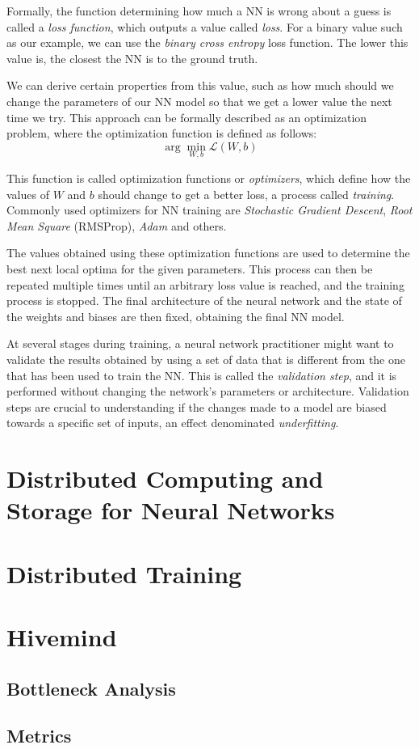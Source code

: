 Formally, the function determining how much a NN is wrong about a guess is called a \textit{loss function}, which outputs a value called \textit{loss}.
For a binary value such as our example, we can use the \textit{binary cross entropy} loss function.
The lower this value is, the closest the NN is to the ground truth.

We can derive certain properties from this value, such as how much should we change the parameters of our NN model so that we get a lower value the next time we try.
This approach can be formally described as an optimization problem, where the optimization function is defined as follows:
\begin{equation}
    \arg \min_{W, b} \mathcal{L} (W, b)
\end{equation}

This function is called optimization functions or \textit{optimizers}, which define how the values of $W$ and $b$ should change to get a better loss, a process called \textit{training}.
Commonly used optimizers for NN training are \textit{Stochastic Gradient Descent}, \textit{Root Mean Square} (RMSProp), \textit{Adam} and others.

The values obtained using these optimization functions are used to determine the best next local optima for the given parameters.
This process can then be repeated multiple times until an arbitrary loss value is reached, and the training process is stopped.
The final architecture of the neural network and the state of the weights and biases are then fixed, obtaining the final NN model.

At several stages during training, a neural network practitioner might want to validate the results obtained by using a set of data that is different from the one that has been used to train the NN.
This is called the \textit{validation step}, and it is performed without changing the network's parameters or architecture.
Validation steps are crucial to understanding if the changes made to a model are biased towards a specific set of inputs, an effect denominated \textit{underfitting}.

\section{Distributed Computing and Storage for Neural Networks}

\section{Distributed Training}

\section{Hivemind}

\subsection{Bottleneck Analysis}

\subsection{Metrics}
